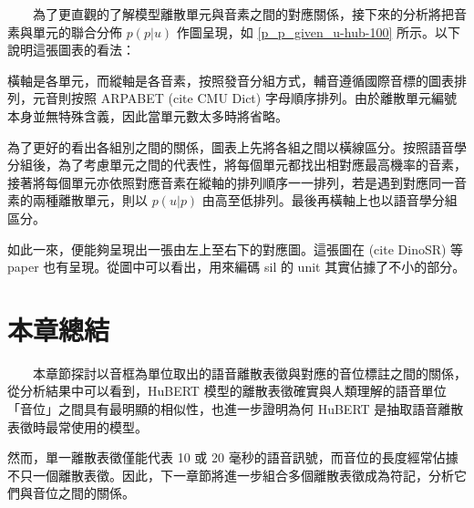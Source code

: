 　　為了更直觀的了解模型離散單元與音素之間的對應關係，接下來的分析將把音素與單元的聯合分佈 \(p(p|u)\) 作圖呈現，如 \ref{p_p_given_u-hub-100} 所示。以下說明這張圖表的看法：

        橫軸是各單元，而縱軸是各音素，按照發音分組方式，輔音遵循國際音標的圖表排列，元音則按照 ARPABET (cite CMU Dict) 字母順序排列。由於離散單元編號本身並無特殊含義，因此當單元數太多時將省略。

        為了更好的看出各組別之間的關係，圖表上先將各組之間以橫線區分。按照語音學分組後，為了考慮單元之間的代表性，將每個單元都找出相對應最高機率的音素，接著將每個單元亦依照對應音素在縱軸的排列順序一一排列，若是遇到對應同一音素的兩種離散單元，則以 \(p(u|p) \) 由高至低排列。最後再橫軸上也以語音學分組區分。

        如此一來，便能夠呈現出一張由左上至右下的對應圖。這張圖在 (cite DinoSR) 等 paper 也有呈現。從圖中可以看出，用來編碼 sil 的 unit 其實佔據了不小的部分。

\section{本章總結}

　　本章節探討以音框為單位取出的語音離散表徵與對應的音位標註之間的關係，從分析結果中可以看到，HuBERT 模型的離散表徵確實與人類理解的語音單位「音位」之間具有最明顯的相似性，也進一步證明為何 HuBERT 是抽取語音離散表徵時最常使用的模型。

        然而，單一離散表徵僅能代表 10 或 20 毫秒的語音訊號，而音位的長度經常佔據不只一個離散表徵。因此，下一章節將進一步組合多個離散表徵成為符記，分析它們與音位之間的關係。
